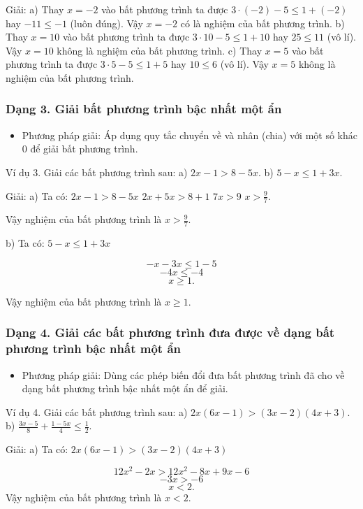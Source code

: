 \documentclass[%
    fontsize=12pt,%
    chapterprefix=false,%
    open=right,%
    twoside=false,%
    numbers=noenddot,%
    headings=optiontohead,%
    final,%
    DIV=15,%
    parskip=half %
]{scrbook}
\begin{document}
Giải: a) Thay $ x = -2 $ vào bất phương trình ta được $ 3 \cdot (-2) - 5 \leq 1 + (-2) $ hay $ -11 \leq -1 $ (luôn đúng). Vậy $ x = -2 $ có là nghiệm của bất phương trình. b) Thay $ x = 10 $ vào bất phương trình ta được $ 3 \cdot 10 - 5 \leq 1 + 10 $ hay $ 25 \leq 11 $ (vô lí). Vậy $ x = 10 $ không là nghiệm của bất phương trình. c) Thay $ x = 5 $ vào bất phương trình ta được $ 3 \cdot 5 - 5 \leq 1 + 5 $ hay $ 10 \leq 6 $ (vô lí). Vậy $ x = 5 $ không là nghiệm của bất phương trình.
\subsubsection{Dạng 3. Giải bất phương trình bậc nhất một ẩn}

\begin{itemize}
  \item Phương pháp giải: Áp dụng quy tắc chuyển về và nhân (chia) với một số khác 0 để giải bất phương trình.
\end{itemize}

Ví dụ 3. Giải các bất phương trình sau:   a) $ 2x - 1 > 8 - 5x $.        b) $ 5 - x \leq 1 + 3x $.

Giải: a) Ta có: $ 2x - 1 > 8 - 5x $     $ 2x + 5x > 8 + 1 $     $ 7x > 9 $     $ x > \frac{9}{7} $.

Vậy nghiệm của bất phương trình là $ x > \frac{9}{7} $.


b) Ta có: $5 - x \leq 1 + 3x$

    \[-x - 3x \leq 1 - 5\]
    \[-4x \leq -4\]
    \[x \geq 1.\]

Vậy nghiệm của bất phương trình là $x \geq 1$.
\subsubsection{Dạng 4. Giải các bất phương trình đưa được về dạng bất phương trình bậc nhất một ẩn}

\begin{itemize}
  \item Phương pháp giải: Dùng các phép biến đổi đưa bất phương trình đã cho về dạng bất phương trình bậc nhất một ẩn để giải.
\end{itemize}

Ví dụ 4. Giải các bất phương trình sau: a) $2x(6x - 1) > (3x - 2)(4x + 3)$. b) $\frac{3x - 5}{8} + \frac{1 - 5x}{4} \leq \frac{1}{2}$.

Giải: a) Ta có: $2x(6x - 1) > (3x - 2)(4x + 3)$

    \[
    12x^2 - 2x > 12x^2 - 8x + 9x - 6
    \]
    \[
    -3x > -6
    \]
    \[
    x < 2.
    \]
Vậy nghiệm của bất phương trình là $x < 2$.
\end{document}
